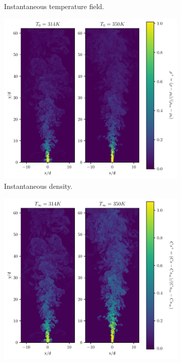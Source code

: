 \begin{figure}[H]
\begin{subfigure}{0.5\textwidth}
	\caption{Instantaneous temperature field.} \label{noniso_temp_1}
\end{subfigure}
\vfill
\begin{subfigure}{0.5\textwidth}
	\centering
	\includegraphics[scale=.45]{figures/Plots/vertical/rho_scaled_vert_noniso.pdf}
	\caption{Instantaneous density.} \label{noniso_rho_1}
\end{subfigure}
\hfill
\begin{subfigure}{0.5\textwidth}
	\centering
	\includegraphics[scale=.45]{figures/Plots/vertical/Cs_scaled_vert_noniso.pdf}

\end{subfigure}
\end{figure}
